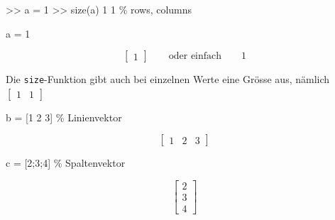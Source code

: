 \documentclass[
  10pt,
  a4paper,
  german]{article}
\newenvironment{Shaded}{}{}
\newcommand{\CommentTok}[1]{\textcolor[rgb]{0.42,0.45,0.49}{#1}}
\newcommand{\FloatTok}[1]{\textcolor[rgb]{0.00,0.36,0.77}{#1}}
\newcommand{\NormalTok}[1]{\textcolor[rgb]{0.14,0.16,0.18}{#1}}
\newcommand{\OperatorTok}[1]{\textcolor[rgb]{0.14,0.16,0.18}{#1}}
\newcommand{\VariableTok}[1]{\textcolor[rgb]{0.89,0.38,0.04}{#1}}
\numberwithin{equation}{section}
\begin{document}
\begin{multicols}{2}
\begin{tcolorbox}
\begin{Shaded}
\begin{Highlighting}[]
\OperatorTok{\textgreater{}\textgreater{}} \VariableTok{a} \OperatorTok{=} \FloatTok{1}
\OperatorTok{\textgreater{}\textgreater{}} \VariableTok{size}\NormalTok{(}\VariableTok{a}\NormalTok{)}
     \FloatTok{1}     \FloatTok{1}  \CommentTok{\% rows, columns}
\end{Highlighting}
\end{Shaded}

\end{tcolorbox}

\begin{Shaded}
\begin{Highlighting}[]
\VariableTok{a} \OperatorTok{=} \FloatTok{1}
\end{Highlighting}
\end{Shaded}

\[
\begin{bmatrix}
1
\end{bmatrix}\qquad \text{oder einfach}\qquad 1 
\]

Die \texttt{size}-Funktion gibt auch bei einzelnen Werte eine Grösse
aus, nämlich \(\begin{bmatrix}1 & 1\end{bmatrix}\)

\begin{Shaded}
\begin{Highlighting}[]
\VariableTok{b} \OperatorTok{=}\NormalTok{ [}\FloatTok{1} \FloatTok{2} \FloatTok{3}\NormalTok{] }\CommentTok{\% Linienvektor}
\end{Highlighting}
\end{Shaded}

\[
\begin{bmatrix}
1 & 2 & 3
\end{bmatrix}
\]

\begin{Shaded}
\begin{Highlighting}[]
\VariableTok{c} \OperatorTok{=}\NormalTok{ [}\FloatTok{2}\OperatorTok{;}\FloatTok{3}\OperatorTok{;}\FloatTok{4}\NormalTok{] }\CommentTok{\% Spaltenvektor}
\end{Highlighting}
\end{Shaded}

\[
\begin{bmatrix}
2 \\ 3 \\ 4
\end{bmatrix}
\]


\end{multicols}
\end{document}

